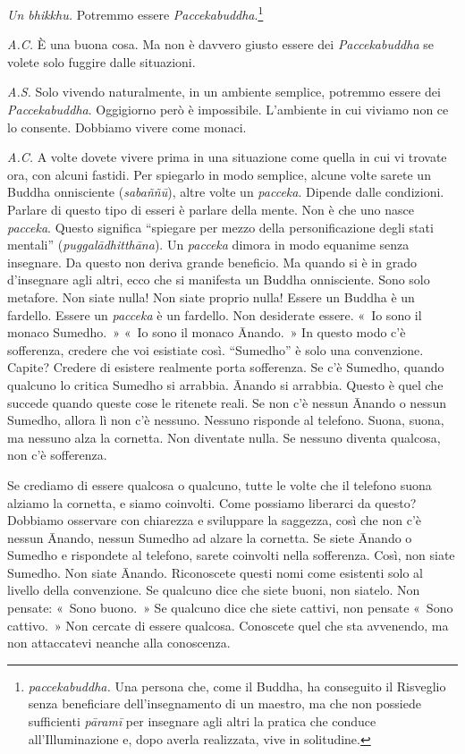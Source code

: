 \emph{Un bhikkhu.} Potremmo essere \emph{Paccekabuddha}.\footnote{\emph{paccekabuddha.}
  Una persona che, come il Buddha, ha conseguito il Risveglio senza
  beneficiare dell'insegnamento di un maestro, ma che non possiede
  sufficienti \emph{pāramī} per insegnare agli altri la pratica che
  conduce all'Illuminazione e, dopo averla realizzata, vive in
  solitudine.}

\emph{A.C.} È una buona cosa. Ma non è davvero giusto essere dei
\emph{Paccekabuddha} se volete solo fuggire dalle situazioni.

\emph{A.S.} Solo vivendo naturalmente, in un ambiente semplice, potremmo
essere dei \emph{Paccekabuddha}. Oggigiorno però è impossibile.
L'ambiente in cui viviamo non ce lo consente. Dobbiamo vivere come
monaci.

\emph{A.C.} A volte dovete vivere prima in una situazione come quella in cui
vi trovate ora, con alcuni fastidi. Per spiegarlo in modo semplice,
alcune volte sarete un Buddha onnisciente (\emph{sabaññū}), altre volte
un \emph{pacceka}. Dipende dalle condizioni. Parlare di questo tipo di
esseri è parlare della mente. Non è che uno nasce \emph{pacceka}. Questo
significa ``spiegare per mezzo della personificazione degli stati
mentali'' (\emph{puggalādhitthāna}). Un \emph{pacceka} dimora in modo
equanime senza insegnare. Da questo non deriva grande beneficio. Ma
quando si è in grado d'insegnare agli altri, ecco che si manifesta un
Buddha onnisciente. Sono solo metafore. Non siate nulla! Non siate
proprio nulla! Essere un Buddha è un fardello. Essere un \emph{pacceka}
è un fardello. Non desiderate essere. «~Io sono il monaco Sumedho.~»
«~Io sono il monaco Ānando.~» In questo modo c'è sofferenza, credere che
voi esistiate così. ``Sumedho'' è solo una convenzione. Capite? Credere
di esistere realmente porta sofferenza. Se c'è Sumedho, quando qualcuno
lo critica Sumedho si arrabbia. Ānando si arrabbia. Questo è quel che
succede quando queste cose le ritenete reali. Se non c'è nessun Ānando o
nessun Sumedho, allora lì non c'è nessuno. Nessuno risponde al telefono.
Suona, suona, ma nessuno alza la cornetta. Non diventate nulla. Se
nessuno diventa qualcosa, non c'è sofferenza.

Se crediamo di essere qualcosa o qualcuno, tutte le volte che il
telefono suona alziamo la cornetta, e siamo coinvolti. Come possiamo
liberarci da questo? Dobbiamo osservare con chiarezza e sviluppare la
saggezza, così che non c'è nessun Ānando, nessun Sumedho ad alzare la
cornetta. Se siete Ānando o Sumedho e rispondete al telefono, sarete
coinvolti nella sofferenza. Così, non siate Sumedho. Non siate Ānando.
Riconoscete questi nomi come esistenti solo al livello della
convenzione. Se qualcuno dice che siete buoni, non siatelo. Non pensate:
«~Sono buono.~» Se qualcuno dice che siete cattivi, non pensate «~Sono
cattivo.~» Non cercate di essere qualcosa. Conoscete quel che sta
avvenendo, ma non attaccatevi neanche alla conoscenza.

